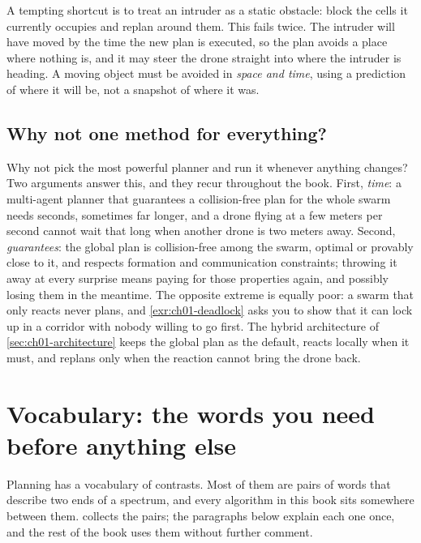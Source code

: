 \begin{pitfall}
A tempting shortcut is to treat an intruder as a static obstacle: block the cells it
currently occupies and replan around them. This fails twice. The intruder will have
moved by the time the new plan is executed, so the plan avoids a place where nothing
is, and it may steer the drone straight into where the intruder is heading. A moving
object must be avoided in \emph{space and time}, using a prediction of where it will
be, not a snapshot of where it was.
\end{pitfall}

\subsection{Why not one method for everything?}
\label{sec:ch01-why-hybrid}

Why not pick the most powerful planner and run it whenever anything changes? Two
arguments answer this, and they recur throughout the book. First, \emph{time}: a
multi-agent planner that guarantees a collision-free plan for the whole swarm needs
seconds, sometimes far longer, and a drone flying at a few meters per second cannot
wait that long when another drone is two meters away. Second, \emph{guarantees}: the
global plan is collision-free among the swarm, optimal or provably close to it, and
respects formation and communication constraints; throwing it away at every surprise
means paying for those properties again, and possibly losing them in the meantime.
The opposite extreme is equally poor: a swarm that only reacts never plans, and
\cref{exr:ch01-deadlock} asks you to show that it can lock up in a corridor with
nobody willing to go first. The hybrid architecture of \cref{sec:ch01-architecture}
keeps the global plan as the default, reacts locally when it must, and replans only
when the reaction cannot bring the drone back.

\section{Vocabulary: the words you need before anything else}
\label{sec:ch01-vocabulary}

Planning has a vocabulary of contrasts. Most of them are pairs of words that describe
two ends of a spectrum, and every algorithm in this book sits somewhere between them.
 collects the pairs; the paragraphs below explain each one
once, and the rest of the book uses them without further comment.

